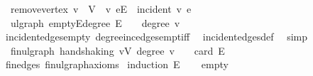 \begin{isabellebody}
\ \ {\isachardoublequoteopen}remove{\isacharunderscore}{\kern0pt}vertex\ v\ {\isacharequal}{\kern0pt}\ {\isacharparenleft}{\kern0pt}V\ {\isacharminus}{\kern0pt}\ {\isacharbraceleft}{\kern0pt}v{\isacharbraceright}{\kern0pt}{\isacharcomma}{\kern0pt}\ {\isacharbraceleft}{\kern0pt}e{\isasymin}E{\isachardot}{\kern0pt}\ {\isasymnot}\ incident\ v\ e{\isacharbraceright}{\kern0pt}{\isacharparenright}{\kern0pt}{\isachardoublequoteclose}%
\isadelimdocument
%
\endisadelimdocument
%
\isatagdocument
%
\isamarkuptrue%
%
\endisatagdocument
{\isafolddocument}%
%
\isadelimdocument
%
\endisadelimdocument
{}\isamarkupfalse%
\ {\isacharparenleft}{\kern0pt}\ ulgraph{\isacharparenright}{\kern0pt}\ empty{\isacharunderscore}{\kern0pt}E{\isacharunderscore}{\kern0pt}degree{\isacharunderscore}{\kern0pt}{}{\isacharcolon}{\kern0pt}\ {\isachardoublequoteopen}E\ {\isacharequal}{\kern0pt}\ {\isacharbraceleft}{\kern0pt}{\isacharbraceright}{\kern0pt}\ {\isasymLongrightarrow}\ degree\ v\ {\isacharequal}{\kern0pt}\ {}{\isachardoublequoteclose}\isanewline
%
\isadelimproof
\ \ %
\endisadelimproof
%
\isatagproof
{}\isamarkupfalse%
\ incident{\isacharunderscore}{\kern0pt}edges{\isacharunderscore}{\kern0pt}empty\ degree{}{\isacharunderscore}{\kern0pt}inc{\isacharunderscore}{\kern0pt}edges{\isacharunderscore}{\kern0pt}empt{\isacharunderscore}{\kern0pt}iff\ \isamarkupfalse%
\ incident{\isacharunderscore}{\kern0pt}edges{\isacharunderscore}{\kern0pt}def\ \isamarkupfalse%
\ simp%
\endisatagproof
{\isafoldproof}%
%
\isadelimproof
\isanewline
%
\endisadelimproof
\isanewline
{}\isamarkupfalse%
\ {\isacharparenleft}{\kern0pt}\ fin{\isacharunderscore}{\kern0pt}ulgraph{\isacharparenright}{\kern0pt}\ handshaking{\isacharcolon}{\kern0pt}\ {\isachardoublequoteopen}{\isacharparenleft}{\kern0pt}{\isasymSum}v{\isasymin}V{\isachardot}{\kern0pt}\ degree\ v{\isacharparenright}{\kern0pt}\ {\isacharequal}{\kern0pt}\ {}\ {\isacharasterisk}{\kern0pt}\ card\ E{\isachardoublequoteclose}\isanewline
%
\isadelimproof
\ \ %
\endisadelimproof
%
\isatagproof
{}\isamarkupfalse%
\ fin{\isacharunderscore}{\kern0pt}edges\ fin{\isacharunderscore}{\kern0pt}ulgraph{\isacharunderscore}{\kern0pt}axioms\isanewline
{}\isamarkupfalse%
\ {\isacharparenleft}{\kern0pt}induction\ E{\isacharparenright}{\kern0pt}\isanewline
\ \ \isamarkupfalse%
\ empty\isanewline
\ \ \isamarkupfalse%
\ \isamarkupfalse%

\end{isabellebody}
